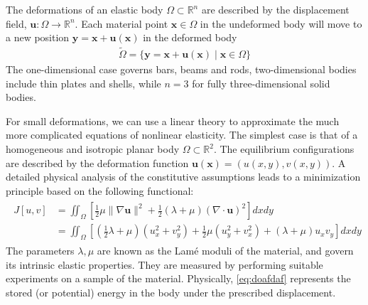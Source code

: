 \documentclass{article}
\begin{document}
\begin{exma}
  The deformations of an elastic body $\Omega \subset \mathbb{R}^{n}$ are described by the displacement field, $\mathbf{u :} \Omega \rightarrow \mathbb{R}^{n} .$ Each material point $\mathbf{x} \in \Omega$ in the undeformed body will move to a new position $\mathbf{y}=\mathbf{x}+\mathbf{u}(\mathbf{x})$ in the deformed body
\begin{align*}
\widetilde{\Omega}=\{\mathbf{y}=\mathbf{x}+\mathbf{u}(\mathbf{x}) \mid \mathbf{x} \in \Omega\}
\end{align*}
The one-dimensional case governs bars, beams and rods, two-dimensional bodies include thin plates and shells, while $n=3$ for fully three-dimensional solid bodies. 

For small deformations, we can use a linear theory to approximate the much more complicated equations of nonlinear elasticity. The simplest case is that of a homogeneous and isotropic planar body $\Omega \subset \mathbb{R}^{2} .$ The equilibrium configurations are described by the deformation function $\mathbf{u}(\mathbf{x})=(u(x, y), v(x, y))$. A detailed physical analysis of the constitutive assumptions leads to a minimization principle based on the following functional:
\begin{align}
\begin{aligned}
J[u, v] &=\iint_{\Omega}\left[\frac{1}{2} \mu\|\nabla \mathbf{u}\|^{2}+\frac{1}{2}(\lambda+\mu)(\nabla \cdot \mathbf{u})^{2}\right] d x d y \\
&=\iint_{\Omega}\left[\left(\frac{1}{2} \lambda+\mu\right)\left(u_{x}^{2}+v_{y}^{2}\right)+\frac{1}{2} \mu\left(u_{y}^{2}+v_{x}^{2}\right)+(\lambda+\mu) u_{x} v_{y}\right] d x d y \label{eq:doafdaf}
\end{aligned}
\end{align}
The parameters $\lambda, \mu$ are known as the Lamé moduli of the material, and govern its intrinsic elastic properties. They are measured by performing suitable experiments on a sample of the material. Physically, \cref{eq:doafdaf} represents the stored (or potential) energy in the body under the prescribed displacement. 


\end{exma}
\end{document}
